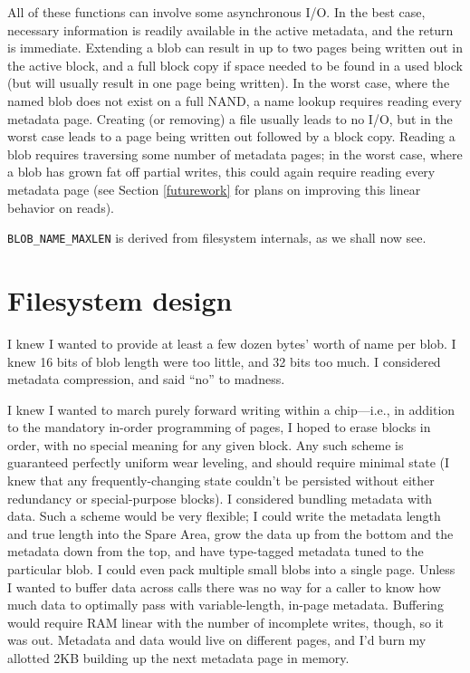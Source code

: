 \documentclass[letterpaper,10pt]{article}
\begin{document}
All of these functions can involve some asynchronous I/O. In the best case,
necessary information is readily available in the active metadata, and the
return is immediate. Extending a blob can result in up to two pages being
written out in the active block, and a full block copy if space needed to be
found in a used block (but will usually result in one page being written).
In the worst case, where the named blob does not exist on a full NAND, a name
lookup requires reading every metadata page. Creating (or removing) a file
usually leads to no I/O, but in the worst case leads to a page being written
out followed by a block copy. Reading a blob requires traversing some number of
metadata pages; in the worst case, where a blob has grown fat off partial
writes, this could again require reading every metadata page (see
Section \ref{futurework} for plans on improving this linear behavior on reads).

\texttt{BLOB\_NAME\_MAXLEN} is derived from filesystem internals, as we shall
now see.

\section{Filesystem design}

I knew I wanted to provide at least a few dozen bytes' worth of name per blob.
I knew 16 bits of blob length were too little, and 32 bits too much.
I considered metadata compression, and said ``no'' to madness.

I knew I wanted to march purely forward writing within a chip---i.e., in
addition to the mandatory in-order programming of pages, I hoped to erase
blocks in order, with no special meaning for any given block. Any such scheme
is guaranteed perfectly uniform wear leveling, and should require minimal state
(I knew that any frequently-changing state couldn't be persisted without either
redundancy or special-purpose blocks). I considered bundling metadata with
data. Such a scheme would be very flexible; I could write the metadata length
and true length into the Spare Area, grow the data up from the bottom and the
metadata down from the top, and have type-tagged metadata tuned to the particular
blob. I could even pack multiple small blobs into a single page. Unless I
wanted to buffer data across calls there was no way for a caller to know how
much data to optimally pass with variable-length, in-page metadata. Buffering
would require RAM linear with the number of incomplete writes, though, so it
was out. Metadata and data would live on different pages, and I'd burn my
allotted 2KB building up the next metadata page in memory.
\end{document}
